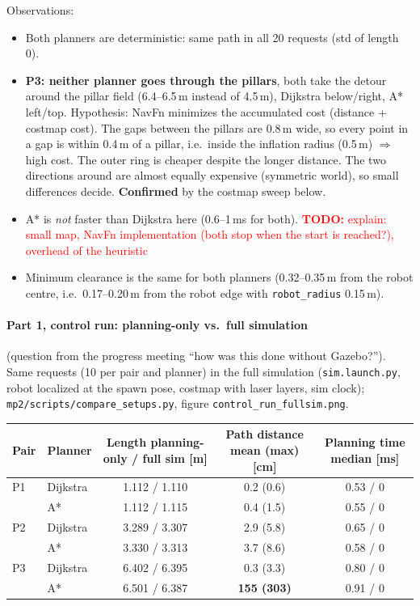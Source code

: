 \documentclass[10pt]{article}
\newcommand{\todo}[1]{\textcolor{red}{\textbf{TODO:} #1}}
\newcommand{\pkg}[1]{\texttt{#1}}
\begin{document}
Observations:
\begin{itemize}
  \item Both planners are deterministic: same path in all 20 requests (std of length 0).
  \item \textbf{P3: neither planner goes through the pillars}, both take the detour around the pillar field
        (6.4--6.5\,m instead of 4.5\,m), Dijkstra below/right, A* left/top.
        Hypothesis: NavFn minimizes the accumulated cost (distance + costmap cost). The gaps between the
        pillars are 0.8\,m wide, so every point in a gap is within 0.4\,m of a pillar, i.e.\ inside the inflation
        radius (0.5\,m) $\Rightarrow$ high cost. The outer ring is cheaper despite the longer distance.
        The two directions around are almost equally expensive (symmetric world), so small differences
        decide. \textbf{Confirmed} by the costmap sweep below.
  \item A* is \emph{not} faster than Dijkstra here (0.6--1\,ms for both). \todo{explain: small map, NavFn
        implementation (both stop when the start is reached?), overhead of the heuristic}
  \item Minimum clearance is the same for both planners (0.32--0.35\,m from the robot centre, i.e.\ 0.17--0.20\,m
        from the robot edge with \pkg{robot\_radius} 0.15\,m).
\end{itemize}

\paragraph{Part 1, control run: planning-only vs.\ full simulation} (question from the progress meeting
``how was this done without Gazebo?''). Same requests (10 per pair and planner) in the full simulation
(\pkg{sim.launch.py}, robot localized at the spawn pose, costmap with laser layers, sim clock);
\pkg{mp2/scripts/compare\_setups.py}, figure \pkg{control\_run\_fullsim.png}.

\begin{tabular}{llccc}
\toprule
Pair & Planner & Length planning-only / full sim [m] & Path distance mean (max) [cm] & Planning time median [ms] \\
\midrule
P1 & Dijkstra & 1.112 / 1.110 & 0.2 (0.6) & 0.53 / 0 \\
   & A*       & 1.112 / 1.115 & 0.4 (1.5) & 0.55 / 0 \\
P2 & Dijkstra & 3.289 / 3.307 & 2.9 (5.8) & 0.65 / 0 \\
   & A*       & 3.330 / 3.313 & 3.7 (8.6) & 0.58 / 0 \\
P3 & Dijkstra & 6.402 / 6.395 & 0.3 (3.3) & 0.80 / 0 \\
   & A*       & 6.501 / 6.387 & \textbf{155 (303)} & 0.91 / 0 \\
\bottomrule
\end{tabular}
\end{document}

